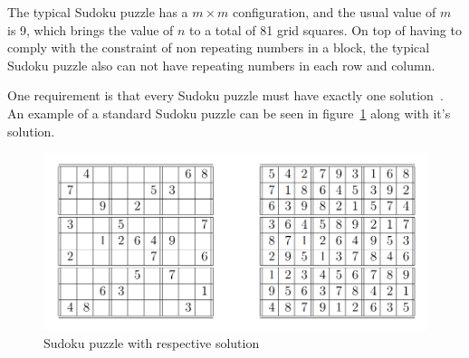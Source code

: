The typical Sudoku puzzle has a $m \times m$ configuration, and the usual value of $m$ is 9, which brings the value of $n$ to a total of 81 grid squares. On top of having to comply with the constraint of non repeating numbers in a block, the typical Sudoku puzzle also can not have repeating numbers in each row and column.

One requirement is that every Sudoku puzzle must have exactly one solution~\cite{provan2009sudoku}. An example of a standard Sudoku puzzle can be seen in figure~\ref{fig:sudoku} along with it's solution.

\begin{figure}[hb]
    \centering
    \includegraphics[width=120mm]{sudoku.png}
    \caption{Sudoku puzzle with respective solution}
    \label{fig:sudoku}
\end{figure}